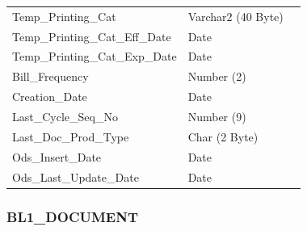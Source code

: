 \documentclass[12pt,twoside]{article}
\begin{document}
\begin{longtable}{l|l|l}
Temp\_Printing\_Cat & Varchar2 (40 Byte) & \\
Temp\_Printing\_Cat\_Eff\_Date & Date & \\
Temp\_Printing\_Cat\_Exp\_Date & Date & \\
Bill\_Frequency & Number (2) & \\
Creation\_Date & Date & \\
Last\_Cycle\_Seq\_No & Number (9) & \\
Last\_Doc\_Prod\_Type & Char (2 Byte) & \\
Ods\_Insert\_Date & Date & \\
Ods\_Last\_Update\_Date & Date & \\
\hline
\end{longtable}

\normalsize

\subsubsection{BL1\_DOCUMENT}
\label{sec:orgheadline152}
\footnotesize
\end{document}
